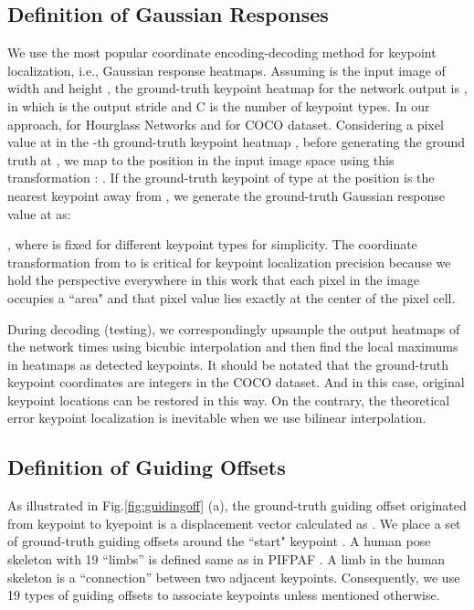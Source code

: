 \documentclass{article}
\begin{document}
\subsection{Definition of Gaussian Responses}
\label{section: gaussin heatmap}
We use the most popular coordinate encoding-decoding method for keypoint localization, i.e., Gaussian response heatmaps. Assuming  is the input image of width  and height , the ground-truth keypoint heatmap for the network output is , in which  is the output stride and C is the number of keypoint types. In our approach,  for Hourglass Networks \cite{Newell2016Stacked, li2020simple, law2018cornernet, Zhou:2019ta} and  for COCO dataset. Considering a pixel value  at  in the -th ground-truth keypoint heatmap  , before generating the ground truth at , we map  to the position  in the input image space  using this transformation \cite{li2020simple,Cao2017Realtime}: . If the ground-truth keypoint of type  at the position  is the nearest keypoint away from , we generate the ground-truth Gaussian response value at  as:

, where  is fixed for different keypoint types for simplicity. 
The coordinate transformation from  to  is critical for keypoint localization precision because we hold the perspective everywhere in this work that each pixel in the image occupies a  ``area" and that pixel value lies exactly at the center of the pixel cell.  


During decoding (testing), we correspondingly upsample the output heatmaps of the network  times using bicubic interpolation and then find the local maximums in heatmaps as detected keypoints.  It should be notated that the ground-truth keypoint coordinates are integers in the COCO dataset. And in this case, original keypoint locations can be restored in this way. On the contrary, the theoretical error keypoint localization is inevitable when we use bilinear interpolation.




\subsection{Definition of Guiding Offsets}
\label{subsec:: definition of guiding offset}

As illustrated in Fig.\ref{fig:guidingoff} (a), the ground-truth guiding offset originated from keypoint  to kyepoint  is a displacement vector calculated as . We place a set of ground-truth guiding offsets around the ``start" keypoint . A human pose skeleton with 19 ``limbs'' is defined same as in PIFPAF \cite{kreiss2019pifpaf}. A limb in the human skeleton is a ``connection'' between two adjacent keypoints. Consequently, we use 19 types of guiding offsets to associate keypoints unless mentioned otherwise. 
\end{document}

